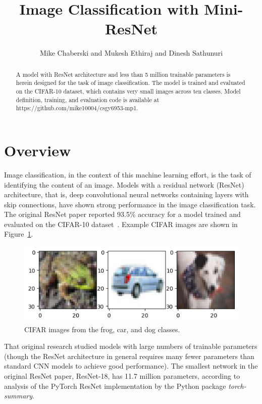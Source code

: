 \documentclass[letterpaper]{article} %
\title{Image Classification with Mini-ResNet}
\author {
    Mike Chaberski
    and
    Mukesh Ethiraj
    and
    Dinesh Sathunuri
}
\begin{document}
\maketitle

\begin{abstract}
    A model with ResNet architecture and less than 5 million trainable parameters is herein designed for the task of
    image classification.
    The model is trained and evaluated on the CIFAR-10 dataset, which contains very small images across ten classes.
    Model definition, training, and evaluation code is available at https://github.com/mike10004/csgy6953-mp1.
\end{abstract}

\section{Overview}

Image classification, in the context of this machine learning effort, is the task of identifying the content of an image.
Models with a residual network (ResNet) architecture, that is, deep convolutional neural networks containing layers with
skip connections, have shown strong performance in the image classification task.
The original ResNet paper reported 93.5\% accuracy for a model trained and evaluated on the CIFAR-10 dataset~\cite{dblp:2015}.
Example CIFAR images are shown in Figure~\ref{fig1}.

\begin{figure}[b]
\centering
\includegraphics[width=0.95\columnwidth]{cifar-example-images}
\caption{CIFAR images from the frog, car, and dog classes.\cite{kriz:2009}}
\label{fig1}
\end{figure}

That original research studied models with large numbers of trainable parameters (though the ResNet architecture in
general requires many fewer parameters than standard CNN models to achieve good performance).
The smallest network in the original ResNet paper, ResNet-18, has 11.7 million parameters, according to
analysis of the PyTorch ResNet implementation by the Python package \textit{torch-summary}.
\end{document}
